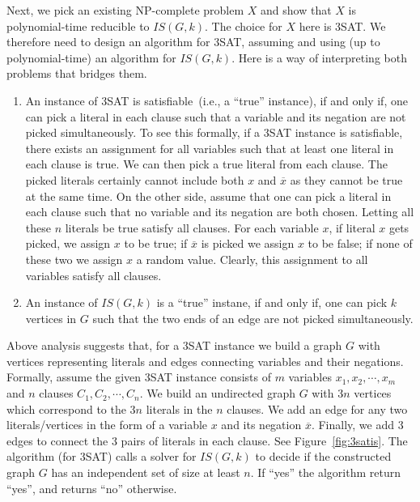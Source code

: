 Next, we pick an existing NP-complete problem $X$ and show that $X$ is polynomial-time reducible to $IS(G, k)$.
The choice for $X$ here is 3SAT.
We therefore need to design an algorithm for 3SAT, assuming and using (up to polynomial-time) an algorithm for $IS(G, k)$.
Here is a way of interpreting both problems that bridges them.
\begin{enumerate}
\vspace*{-\topsep}
\item An instance of 3SAT is satisfiable~(i.e., a ``true'' instance), if and only if, one can pick a literal in each clause such that 
a variable and its negation are not picked simultaneously. To see this formally, if a 3SAT instance is satisfiable,
there exists an assignment for all variables such that at least one literal in each clause is true. We can then pick
a true literal from each clause. The picked literals certainly cannot include both $x$ and $\overline{x}$ as they cannot
be true at the same time. On the other side, assume that one can pick a literal in each clause such that 
no variable and its negation are both chosen.  Letting all these $n$ literals be true satisfy all clauses. 
For each variable $x$,
if literal $x$ gets picked, we assign $x$ to be true; if $\overline{x}$ is picked we assign $x$ to be false; if
none of these two we assign $x$ a random value. Clearly, this assignment to all variables satisfy all clauses. 
\item An instance of $IS(G,k)$ is a ``true'' instane, if and only if, one can pick $k$ vertices in $G$ such that
the two ends of an edge are not picked simultaneously.
\end{enumerate}

Above analysis suggests that, for a 3SAT instance we build a graph $G$ with
vertices representing literals and edges connecting variables and their negations.
Formally, assume the given 3SAT instance consists of $m$ variables $x_1, x_2, \cdots, x_m$
and $n$ clauses $C_1, C_2, \cdots, C_n$. We build an undirected graph $G$ with $3n$ vertices which
correspond to the $3n$ literals in the $n$ clauses. We add an edge for any two literals/vertices
in the form of a variable $x$ and its negation $\overline{x}$.
Finally, we add 3 edges to connect the 3 pairs of literals in each clause.
See Figure~\ref{fig:3satis}. The algorithm (for 3SAT) calls a solver for $IS(G,k)$
to decide if the constructed graph $G$ has an independent set of size at least $n$.
If ``yes'' the algorithm return ``yes'', and returns ``no'' otherwise.

